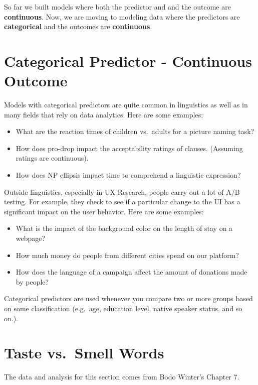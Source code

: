 \documentclass[
]{book}
\providecommand{\tightlist}{%
  \setlength{\itemsep}{0pt}\setlength{\parskip}{0pt}}
\begin{document}
So far we built models where both the predictor and and the outcome are \textbf{continuous}. Now, we are moving to modeling data where the predictors are \textbf{categorical} and the outcomes are \textbf{continuous}.

\section{Categorical Predictor - Continuous Outcome}\label{categorical-predictor---continuous-outcome}

Models with categorical predictors are quite common in linguistics as well as in many fields that rely on data analytics. Here are some examples:

\begin{itemize}
\tightlist
\item
  What are the reaction times of children vs.~adults for a picture naming task?
\item
  How does pro-drop impact the acceptability ratings of clauses. (Assuming ratings are continuous).
\item
  How does NP ellipsis impact time to comprehend a linguistic expression?
\end{itemize}

Outside linguistics, especially in UX Research, people carry out a lot of A/B testing. For example, they check to see if a particular change to the UI has a significant impact on the user behavior. Here are some examples:

\begin{itemize}
\tightlist
\item
  What is the impact of the background color on the length of stay on a webpage?
\item
  How much money do people from different cities spend on our platform?
\item
  How does the language of a campaign affect the amount of donations made by people?
\end{itemize}

Categorical predictors are used whenever you compare two or more groups based on some classification (e.g.~age, education level, native speaker status, and so on.).

\section{Taste vs.~Smell Words}\label{taste-vs.-smell-words}

The data and analysis for this section comes from Bodo Winter's Chapter 7.
\end{document}
